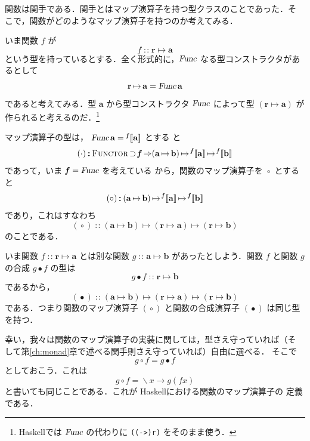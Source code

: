 \documentclass[a5paper,twoside,fleqn,draft]{jsbook}
\def\[{[\![}
\def\]{]\!]}
\newcommand{\programminglanguage}[1]{\textsf{#1}}
\newcommand{\haskell}{\programminglanguage{Haskell}}
\newcommand{\code}[1]{\texttt{#1}}
\DeclareMathOperator{\mSuperClass}{\Rightarrow}
\DeclareMathOperator{\mSuperSet}{\supset}
\DeclareMathOperator{\mComp}{\bullet}
\DeclareMathOperator{\mIn}{{:\!:}}
\DeclareMathOperator{\mLambda}{\backslash}
\DeclareMathOperator{\mLambdaArrow}{\rightarrow}
\DeclareMathOperator{\mMap}{\cdot}
\DeclareMathOperator{\mMapFunc}{\circ}
\DeclareMathOperator{\mMapsTo}{\mapsto}
\newcommand{\mType}[1]{\mathbf{#1}} %
\newcommand{\mPolymorphicTypeParameter}[1]{\textbf{\textit{#1}}}
\newcommand{\mA}{\mType{a}}
\newcommand{\mB}{\mType{b}}
\newcommand{\mR}{\mType{r}}
\newcommand{\mPolymorphicTypeAssemble}[2]{{}^\mPolymorphicTypeParameter{#1}\[\mType{#2}\]}
\newcommand{\mTypeConstructor}[1]{\textsl{#1}}
\newcommand{\mFuncTypeConstructor}[1]{\mathop{\mTypeConstructor{Func}}}%
\newcommand{\mTypeClass}[1]{\textsc{#1}} %
\newcommand{\mFunctorTypeClass}{\mTypeClass{Functor}}
\newcommand{\mLambdaEXP}[2]{\mLambda{#1}\mLambdaArrow{#2}} %
\newcommand{\mProjEXP}[2]{#1\mMapsTo#2} %
\begin{document}
関数は関手である．関手とはマップ演算子を持つ型クラスのことであった．そ
こで，関数がどのようなマップ演算子を持つのか考えてみる．

いま関数 $f$ が
\begin{equation}
  f
  \mIn\mR\mMapsTo\mA
\end{equation}
という型を持っているとする．全く形式的に，$\mFuncTypeConstructor{r}$
なる型コンストラクタがあるとして
\begin{equation}
  \mR\mMapsTo\mA=\mFuncTypeConstructor{r}\mA
\end{equation}
であると考えてみる．型 $\mA$ から型コンストラクタ
$\mFuncTypeConstructor{r}$ によって型 $(\mProjEXP{\mR}{\mA})$ が
作られると考えるのだ．\footnote{\haskell では $\mFuncTypeConstructor{r}$
  の代わりに \code{((->)r)} をそのまま使う．}

マップ演算子の型は，
$\mFuncTypeConstructor{r}\mA=\mPolymorphicTypeAssemble{f}{\mA}$ とする
と
\begin{equation}
  (\mMap)
  \mIn{}\mFunctorTypeClass\mSuperSet\mPolymorphicTypeParameter{f}
  \mSuperClass(\mA\mMapsTo\mB)
  \mMapsTo\mPolymorphicTypeAssemble{f}{a}
  \mMapsTo\mPolymorphicTypeAssemble{f}{b}
\end{equation}
であって，いま
$\mPolymorphicTypeParameter{f}=\mFuncTypeConstructor{r}$ を考えている
から，関数のマップ演算子を $\mMapFunc$ とすると
\begin{equation}
  (\mMapFunc)
  \mIn{}(\mA\mMapsTo\mB)
  \mMapsTo\mPolymorphicTypeAssemble{f}{\mA}
  \mMapsTo\mPolymorphicTypeAssemble{f}\mB
\end{equation}
であり，これはすなわち
\begin{equation}
  (\mMapFunc)
  \mIn{}(\mA\mMapsTo\mB)
  \mMapsTo(\mR\mMapsTo\mA)
  \mMapsTo(\mR\mMapsTo\mB)
\end{equation}
のことである．

いま関数 $f\mIn\mProjEXP{\mR}{\mA }$ とは別な関数
$g\mIn\mProjEXP{\mA }{\mB }$ があったとしよう．関数 $f$ と関数
$g$ の合成 $g\mComp f$ の型は
\begin{equation}
g\mComp f\mIn\mProjEXP{\mR}{\mB }
\end{equation}
であるから，
\begin{equation}
(\mComp)\mIn{}\mProjEXP{\mProjEXP{(\mProjEXP{\mA }{\mB })}{(\mProjEXP{\mR}{\mA })}}
  {(\mProjEXP{\mR}{\mB })}
\end{equation}
である．つまり関数のマップ演算子 $(\mMapFunc)$ と関数の合成演算子
$(\mComp)$ は同じ型を持つ．

幸い，我々は関数のマップ演算子の実装に関しては，型さえ守っていれば（そ
  して第\ref{ch:monad}章で述べる関手則さえ守っていれば）自由に選べる．
そこで
\begin{equation}
  g\mMapFunc f
  =g\mComp f
\end{equation}
としておこう．これは
\begin{equation}
  g\mMapFunc f
  =\mLambdaEXP{x}{g(fx)}
\end{equation}
と書いても同じことである．これが \haskell における関数のマップ演算子の
定義である．
\end{document}
